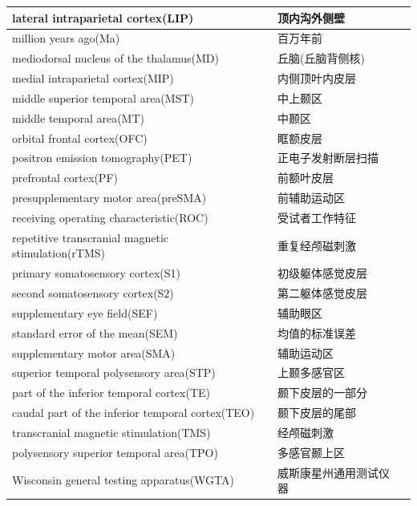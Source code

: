 \begin{table}[htbp]
{\begin{tabular}{llll}
        \midrule
        lateral intraparietal cortex(LIP)       &&顶内沟外侧壁   \\
        \midrule
        million years ago(Ma)       &&百万年前   \\
        \midrule
        mediodorsal nucleus of the thalamus(MD)      &&丘脑(丘脑背侧核)   \\
        \midrule
        medial intraparietal cortex(MIP)      &&内侧顶叶内皮层   \\
        \midrule
        middle superior temporal area(MST)     &&中上颞区   \\
        \midrule
        middle temporal area(MT)       &&中颞区   \\
        \midrule
        orbital frontal cortex(OFC)       &&眶额皮层   \\
        \midrule
        positron emission tomography(PET)       &&正电子发射断层扫描   \\
        \midrule
        prefrontal cortex(PF)       &&前额叶皮层   \\
        \midrule
        presupplementary motor area(preSMA)       &&前辅助运动区   \\
        \midrule
        receiving operating characteristic(ROC)       &&受试者工作特征   \\
        \midrule
        repetitive transcranial magnetic stimulation(rTMS)      &&重复经颅磁刺激   \\
        \midrule
        primary somatosensory cortex(S1)      &&初级躯体感觉皮层   \\
        \midrule
        second somatosensory cortex(S2)      &&第二躯体感觉皮层   \\
        \midrule
        supplementary eye field(SEF)      &&辅助眼区   \\
        \midrule
        standard error of the mean(SEM)      &&均值的标准误差   \\
        \midrule
        supplementary motor area(SMA)      &&辅助运动区   \\
        \midrule
        superior temporal polysensory area(STP)      &&上颞多感官区   \\
        \midrule
        part of the inferior temporal cortex(TE)     &&颞下皮层的一部分   \\
        \midrule
        caudal part of the inferior temporal cortex(TEO)      &&颞下皮层的尾部   \\
        \midrule
        transcranial magnetic stimulation(TMS)     &&经颅磁刺激   \\
        \midrule
        polysensory superior temporal area(TPO)      &&多感官颞上区   \\
        \midrule
        Wisconsin general testing apparatus(WGTA)      &&威斯康星州通用测试仪器   \\

		\bottomrule  

	\end{tabular}}
\end{table}%





